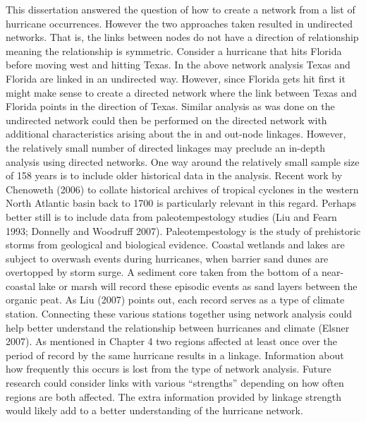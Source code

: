 This dissertation answered the question of how to create a network from a list of hurricane occurrences. However the two approaches taken resulted in undirected networks. That is, the links between nodes do not have a direction of relationship meaning the relationship is symmetric. Consider a hurricane that hits Florida before moving west and hitting Texas. In the above network analysis Texas and Florida are linked in an undirected way. However, since Florida gets hit first it might make sense to create a directed network where the link between Texas and Florida points in the direction of Texas. Similar analysis as was done on the undirected network could then be performed on the directed network with additional characteristics arising about the in and out-node linkages. However, the relatively small number of directed linkages may preclude an in-depth analysis using directed networks.
One way around the relatively small sample size of 158 years is to include older historical data in the analysis. Recent work by Chenoweth (2006) to collate historical archives of tropical cyclones in the western North Atlantic basin back to 1700 is particularly relevant in this regard. Perhaps better still is to include data from paleotempestology studies (Liu and Fearn 1993; Donnelly and Woodruff 2007). Paleotempestology is the study of prehistoric storms from geological and biological evidence. Coastal wetlands and lakes are subject to overwash events during hurricanes, when barrier sand dunes are overtopped by storm surge. A sediment core taken from the bottom of a near-coastal lake or marsh will record these episodic events as sand layers between the organic peat. As Liu (2007) points out, each record serves as a type of climate station. Connecting these various stations together using network analysis could help better understand the relationship between hurricanes and climate (Elsner 2007).
As mentioned in Chapter 4 two regions affected at least once over the period of record by the same hurricane results in a linkage. Information about how frequently this occurs is lost from the type of network analysis. Future research could consider links with various “strengths” depending on how often regions are both affected. The extra information provided by linkage strength would likely add to a better understanding of the hurricane network.
